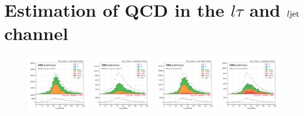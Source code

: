 \section{Estimation of QCD in the $l\tau$ and $l\rm{jet}$ channel}


\begin{figure}
    \centering
    \includegraphics[width=0.24\textwidth]{chapters/Appendix/sectionQCD/figures/mutau_==0_==0_dilepton_mass.png}
    \includegraphics[width=0.24\textwidth]{chapters/Appendix/sectionQCD/figures/mutau_ss_==0_==0_dilepton_mass.png}
    \includegraphics[width=0.24\textwidth]{chapters/Appendix/sectionQCD/figures/etau_==0_==0_dilepton_mass.png}
    \includegraphics[width=0.24\textwidth]{chapters/Appendix/sectionQCD/figures/etau_ss_==0_==0_dilepton_mass.png}
    

\end{figure}
